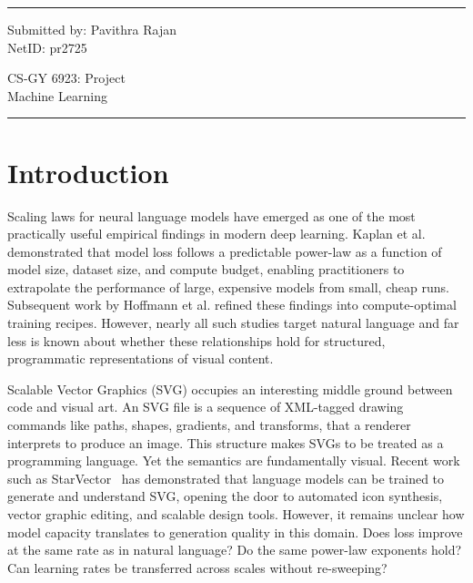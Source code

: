 \documentclass[a4paper]{article}
\begin{document}
\fancyhead[C]{}
\hrule \medskip %
\begin{minipage}{0.295\textwidth} 
\raggedright
\footnotesize
Submitted by: Pavithra Rajan \hfill\\   
NetID: pr2725\hfill\\
\end{minipage}
\begin{minipage}{0.4\textwidth} 
\centering 
\large 
CS-GY 6923: Project\\ 
\normalsize 
Machine Learning\\ 
\end{minipage}
\begin{minipage}{0.295\textwidth} 
\raggedleft

\end{minipage}
\medskip\hrule 
\bigskip

\section{Introduction}

Scaling laws for neural language models have emerged as one of the most practically useful empirical findings in modern deep learning. Kaplan et al.\cite{1} demonstrated that model loss follows a predictable power-law as a function of model size, dataset size, and compute budget, enabling practitioners to extrapolate the performance of large, expensive models from small, cheap runs. Subsequent work by Hoffmann et al.\cite{2} refined these findings into compute-optimal training recipes. However, nearly all such studies target natural language and far less is known about whether these relationships hold for structured, programmatic representations of visual content.
\vspace{5pt}

Scalable Vector Graphics (SVG) occupies an interesting middle ground between code and visual art. An SVG file is a sequence of XML-tagged drawing commands like paths, shapes, gradients, and transforms, that a renderer interprets to produce an image. This structure makes SVGs to be treated as a programming language. Yet the semantics are fundamentally visual. Recent work such as StarVector~\cite{4} has demonstrated that language models can be trained to generate and understand SVG, opening the door to automated icon synthesis, vector graphic editing, and scalable design tools. However, it remains unclear how model capacity translates to generation quality in this domain. Does loss improve at the same rate as in natural language? Do the same power-law exponents hold? Can learning rates be transferred across scales without re-sweeping?
\vspace{5pt}
\end{document}
